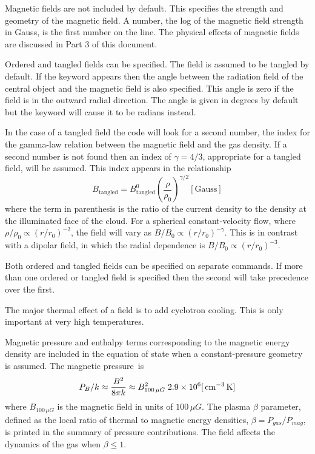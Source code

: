 Magnetic fields are not included by default.
This specifies the strength
and geometry of the magnetic field.
A number, the log of the magnetic field
strength in Gauss, is the first number on the line.
The physical effects
of magnetic fields are discussed in Part 3 of this document.

Ordered and tangled fields can be specified.
The field is assumed to
be tangled by default.
If the keyword  appears then the angle between
the radiation field of the central object and the magnetic field
is also specified.
This angle is zero if the field is in the outward radial
direction.
The angle is given in degrees by default but the
 keyword
will cause it to be radians instead.

In the case of a tangled field the code will look for a second number,
the index for the gamma-law relation between the magnetic field and the
gas density.
If a second number is not found then an index of $\gamma = 4/3$,
appropriate for a tangled field, will be assumed.
This index appears in the relationship
\begin{equation}
B_{{\mathrm{tangled}}}  = B_{{\mathrm{tangled}}}^0 \left( {\frac{\rho }{{\rho _0
}}} \right)^{\gamma /2}
 [\mathrm{Gauss}]
\end{equation}
where the term in parenthesis is the ratio of the current density to the
density at the illuminated face of the cloud.
For a spherical
constant-velocity flow, where ${\rho /\rho _0 }\propto(r/r_0 )^{-2} $, the
field will vary as  $B/B_0\propto( r/r_0 )^{-\gamma }$.
This is in contrast with a dipolar field,
in which the radial dependence
is $B/B_0 \propto( r /r_0 )^{-3}$.

Both ordered and tangled fields can be specified on separate commands.
If more than one ordered or tangled field is specified then the second
will take precedence over the first.

The major thermal effect of a field is to add cyclotron cooling.
This is only important at very high temperatures.

Magnetic pressure and enthalpy terms corresponding to the magnetic energy
density are included in the equation of state when a constant-pressure
geometry is assumed.
The magnetic pressure~is
\begin{equation}
P_B /k \approx \frac{{B^2 }}{{8\pi k}} \approx B_{100\,\mu G}^2
\;2.9 \times 10^6 [{\rm\thinspace cm^{-3}} {\rm\thinspace K}]
\end{equation}
where $B_{100\,\mu G}$ is
the magnetic field in units of $100\,\mu G$.
The plasma $\beta$ parameter, defined
as the local ratio of thermal to magnetic energy densities,
$\beta  = P_{gas} /P_{mag} $,
is printed in the summary of pressure contributions.
The field affects the dynamics of the gas when $\beta\le 1$.


